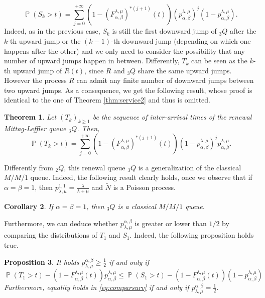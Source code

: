 \documentclass[]{amsart}
\numberwithin{equation}{section}
\newtheorem{thm}{Theorem}[section]
\newtheorem{prop}[thm]{Proposition}
\newtheorem{cor}[thm]{Corollary}
\theoremstyle{remark}
\theoremstyle{definition}
\DeclareMathOperator{\bP}{\mathbb{P}}
\begin{document}
\begin{equation}\label{eq:serv2Q}
	\bP(S_k>t)
	=\sum_{j=0}^{+\infty}(1-(F_{\alpha,\beta}^{\lambda, \mu})^{\ast (j+1)}(t))(p_{\alpha,\beta}^{\lambda,\mu})^j(1-p_{\alpha,\beta}^{\lambda,\mu}).
\end{equation}
Indeed, as in the previous case, ${S}_k$ is still the first downward jump of ${}_3{Q}$ after the $k$-th upward jump or the $(k-1)$-th downward jump (depending on which one happens after the other) and we only need to consider the possibility that any number of upward jumps happen in between. Differently, ${T}_k$ can be seen as the $k$-th upward jump of $R(t)$, since $R$ and ${}_3{Q}$ share the same upward jumps. However the process $R$ can admit any finite number of downward jumps between two upward jumps. As a consequence, we get the following result, whose proof is identical to the one of Theorem \ref{thm:service2} and thus is omitted.
\begin{thm}\label{thm:interarrival22}
	Let $({T}_k)_{k \ge 1}$ be the sequence of inter-arrival times of the renewal Mittag-Leffler queue ${}_3{Q}$. Then,
	\begin{equation}\label{eq:interarrival2}
		\bP({T}_k>t)
		=\sum_{j=0}^{+\infty}(1-(F_{\alpha,\beta}^{\lambda, \mu})^{\ast (j+1)}(t))(1-p_{\alpha,\beta}^{\lambda,\mu})^jp_{\alpha,\beta}^{\lambda,\mu}.
	\end{equation}
\end{thm}
Differently from ${}_2Q$, this renewal queue ${}_3{Q}$ is a generalization of the classical $M/M/1$ queue. {Indeed, the following result clearly holds, once we observe that if $\alpha=\beta=1$, then $p^{1,1}_{\lambda,\mu}=\frac{\lambda}{\lambda+\mu}$ and $\widetilde{N}$ is a Poisson process.}
\begin{cor}
	If $\alpha=\beta=1$, then ${}_3{Q}$ is a classical $M/M/1$ queue.
\end{cor}
Furthermore, we can deduce whether $p_{\lambda,\mu}^{\alpha,\beta}$ is greater or lower than $1/2$ by comparing the distributions of $T_1$ and $S_1$. Indeed, the following proposition holds true.
\begin{prop}\label{prop:comparison}
	It holds $p_{\lambda,\mu}^{\alpha,\beta} \ge \frac{1}{2}$ if and only if
	\begin{equation}\label{eq:comparsurv}
		\bP({T}_1>t)-(1-F_{\alpha,\beta}^{\lambda,\mu}(t))p_{\alpha,\beta}^{\lambda,\mu} \le \bP({S}_1>t)-(1-F_{\alpha,\beta}^{\lambda,\mu}(t))(1-p_{\alpha,\beta}^{\lambda,\mu}) 
	\end{equation}
	Furthermore, equality holds in \eqref{eq:comparsurv} if and only if $p_{\lambda,\mu}^{\alpha,\beta}=\frac{1}{2}$.
\end{prop}
\end{document}
